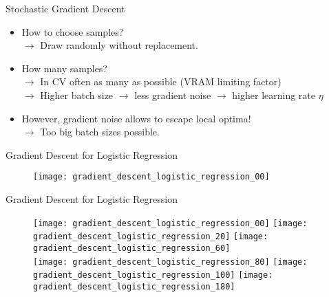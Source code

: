 \begin{frame}{Stochastic Gradient Descent}
  \begin{itemize}
    \item How to choose samples? \\
          $\rightarrow$ Draw randomly without replacement.
    \item How many samples? \\
          $\rightarrow$ In CV often as many as possible (VRAM limiting factor) \\
          $\rightarrow$ Higher batch size $\rightarrow$ less gradient noise $\rightarrow$ higher learning rate $\eta$
    \item However, gradient noise allows to escape local optima! \\
          $\rightarrow$ Too big batch sizes possible.
  \end{itemize}

\end{frame}


\begin{frame}{Gradient Descent for Logistic Regression}
  \begin{figure}
    \texttt{[image: gradient\_descent\_logistic\_regression\_00]}
  \end{figure}

\end{frame}


\begin{frame}{Gradient Descent for Logistic Regression}
  \begin{figure}
    \texttt{[image: gradient\_descent\_logistic\_regression\_00]}
    \texttt{[image: gradient\_descent\_logistic\_regression\_20]}
    \texttt{[image: gradient\_descent\_logistic\_regression\_60]}\\
    \texttt{[image: gradient\_descent\_logistic\_regression\_80]}
    \texttt{[image: gradient\_descent\_logistic\_regression\_100]}
    \texttt{[image: gradient\_descent\_logistic\_regression\_180]}
  \end{figure}

\end{frame}
